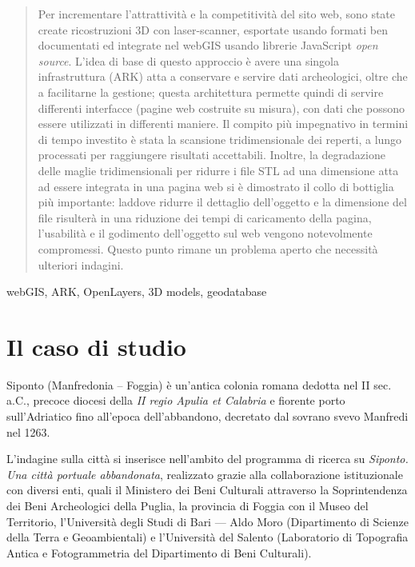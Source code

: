 \documentclass{paper}
\newenvironment{poliabstract}[1]
{\renewcommand{\abstractname}{#1}\begin{abstract}}
{\end{abstract}}
\begin{document}
\begin{poliabstract}{Sommario}
Per incrementare l'attrattività e la competitività del sito web, sono state create ricostruzioni 3D con laser-scanner, esportate usando formati ben documentati ed integrate nel webGIS usando librerie JavaScript \textit{open source}.
L'idea di base di questo approccio è avere una singola infrastruttura (ARK) atta a conservare e servire dati archeologici, oltre che a facilitarne la gestione; questa architettura permette quindi di servire differenti interfacce (pagine web costruite su misura), con dati che possono essere utilizzati in differenti maniere. Il compito più impegnativo in termini di tempo investito è stata la scansione tridimensionale dei reperti, a lungo processati per raggiungere risultati accettabili. Inoltre, la degradazione delle maglie tridimensionali per ridurre i file STL ad una dimensione atta ad essere integrata in una pagina web si è dimostrato il collo di bottiglia più importante: laddove ridurre il dettaglio dell'oggetto e la dimensione del file risulterà in una riduzione dei tempi di caricamento della pagina, l'usabilità e il godimento dell'oggetto sul web vengono notevolmente compromessi. Questo punto rimane un problema aperto che necessità ulteriori indagini.
\end{poliabstract}

\begin{keywords}
    webGIS, ARK, OpenLayers, 3D models, geodatabase
\end{keywords}

\pagebreak{}

\section{Il caso di studio}

    Siponto (Manfredonia -- Foggia) è un'antica colonia romana dedotta nel II sec. a.C., precoce diocesi della \emph{II regio Apulia et Calabria} e fiorente porto sull'Adriatico fino all'epoca dell'abbandono, decretato dal sovrano svevo Manfredi nel 1263. 

    L'indagine sulla città si inserisce nell'ambito del programma di ricerca su \emph{Siponto. Una città portuale abbandonata}, realizzato grazie alla collaborazione istituzionale con diversi enti, quali il Ministero dei Beni Culturali attraverso la Soprintendenza dei Beni Archeologici della Puglia, la provincia di Foggia con il Museo del Territorio, l'Università degli Studi di Bari --- Aldo Moro (Dipartimento di Scienze della Terra e Geoambientali) e l'Università del Salento (Laboratorio di Topografia Antica e Fotogrammetria del Dipartimento di Beni Culturali). 
\end{document}
